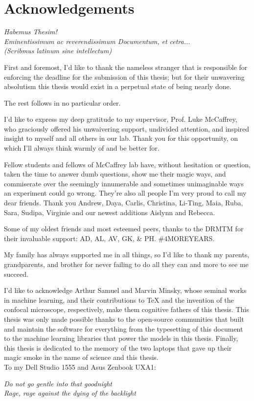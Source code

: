 \newpage
\section*{Acknowledgements}
\begin{singlespace}
	\emph{Habemus Thesim!\\
		Eminentissimum ac reverendissimum Documentum, et cetra...\\
		(Scribmus latinum sine intellectum)}
\end{singlespace}

First and foremost, I'd like to thank the nameless stranger that is responsible for enforcing the deadline for the submission of this thesis; but for their unwavering absolutism this thesis would exist in a perpetual state of being nearly done.

The rest follows in no particular order.

I'd like to express my deep gratitude to my supervisor, Prof. Luke McCaffrey, who graciously offered his unwaivering support, undivided attention, and inspired insight to myself and all others in our lab. Thank you for this opportunity, on which I'll always think warmly of and be better for.

Fellow students and fellows of McCaffrey lab have, without hesitation or question, taken the time to answer dumb questions, show me their magic ways, and commiserate over the seemingly innumerable and sometimes unimaginable ways an experiment could go wrong. They're also all people I'm very proud to call my dear friends. Thank you Andrew, Daya, Carlis, Christina, Li-Ting, Maia, Ruba, Sara, Sudipa, Virginie and our newest additions Aislynn and Rebecca.

Some of my oldest friends and most esteemed peers, thanks to the DRMTM for their invaluable support: AD, AL, AV, GK, \& PH. \#4MOREYEARS.

My family has always supported me in all things, so I'd like to thank my parents, grandparents, and brother for never failing to do all they can and more to see me succeed. 

I'd like to acknowledge Arthur Samuel and Marvin Minsky, whose seminal works in machine learning, and their contributions to \TeX\xspace and the invention of the confocal microscope, respectively, make them cognitive fathers of this thesis. This thesis was only made possible thanks to the open-source communities that built and maintain the software for everything from the typesetting of this document to the machine learning libraries that power the models in this thesis.
\newpage
Finally, this thesis is dedicated to the memory of the two laptops that gave up their magic smoke in the name of science and this thesis.\\
To my Dell Studio 1555 and Asus Zenbook UXA1:
\begin{singlespace}
	\noindent
	\emph{Do not go gentle into that goodnight\\
		Rage, rage against the dying of the backlight}
\end{singlespace}

